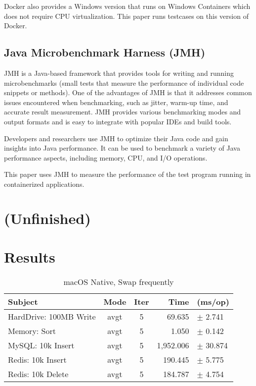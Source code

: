 \documentclass{IEEEtran}
\begin{document}
Docker also provides a Windows version that runs on Windows Containers which does not require CPU virtualization. This paper runs testcases on this version of Docker.

\subsection{Java Microbenchmark Harness (JMH)}

JMH is a Java-based framework that provides tools for writing and running microbenchmarks (small tests that measure the performance of individual code snippets or methods). One of the advantages of JMH is that it addresses common issues encountered when benchmarking, such as jitter, warm-up time, and accurate result measurement. JMH provides various benchmarking modes and output formats and is easy to integrate with popular IDEs and build tools.

Developers and researchers use JMH to optimize their Java code and gain insights into Java performance. It can be used to benchmark a variety of Java performance aspects, including memory, CPU, and I/O operations.

This paper uses JMH to measure the performance of the test program running in containerized applications.

\section{(Unfinished)}

\section{Results}

\begin{table*}
    \centering
    \label{tab:macos-native-swap}
    \caption{macOS Native, Swap frequently}
    \begin{tabular}{l c c r l}
        \hline
        \textbf{Subject} & \textbf{Mode} & \textbf{Iter} & \textbf{Time} & \textbf{(ms/op)} \\
        \hline
        HardDrive: 100MB Write & avgt & 5 & 69.635 &$\pm$ 2.741 \\
        Memory: Sort      & avgt & 5 & 1.050 &$\pm$ 0.142 \\
        MySQL: 10k Insert & avgt & 5 & 1,952.006 &$\pm$ 30.874 \\
        Redis: 10k Insert & avgt & 5 & 190.445 &$\pm$ 5.775 \\
        Redis: 10k Delete & avgt & 5 & 184.787 &$\pm$ 4.754 \\
    \end{tabular}
\end{table*}
\end{document}
